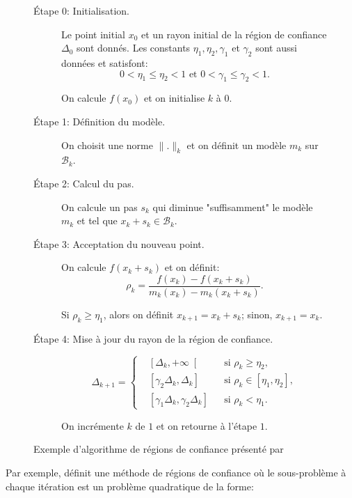 \begin{figure}
  \centering
  \begin{description}
    \item[\'Etape 0: Initialisation.] Le point initial $x_0$ et un rayon initial de la région de confiance  $\Delta_0$ sont donnés. 
    Les constants $\eta_1, \eta_2, \gamma_1$ et $\gamma_2$ sont aussi données et satisfont:
    \begin{equation*}
      0<\eta_1\leq\eta_2<1 \text{ et } 0<\gamma_1\leq\gamma_2<1.
    \end{equation*}

    On calcule $f(x_0)$ et on initialise $k$ à $0$.
    \item[\'Etape 1: Définition du modèle.] On choisit une norme $\|.\|_k$ et on définit un modèle $m_k$ sur $\mathcal{B}_k$.
    \item[\'Etape 2: Calcul du pas.] On calcule un pas $s_k$ qui diminue "suffisamment" le modèle $m_k$ et tel que $x_k+s_k\in \mathcal{B}_k$.
    \item[\'Etape 3: Acceptation du nouveau point.] On calcule $f(x_k+s_k)$ et on définit:
    \begin{equation}
      \rho_k = \dfrac{f(x_k)-f(x_k+s_k)}{m_k(x_k)-m_k(x_k+s_k)}.
    \end{equation}

    Si $\rho_k\geq \eta_1$, alors on définit $x_{k+1} = x_k+s_k$; sinon, $x_{k+1}=x_k$.
    \item[\'Etape 4: Mise à jour du rayon de la région de confiance.] 
    \begin{equation}
      \Delta_{k+1} = \left\{ \begin{aligned}
        &\left[\Delta_k, +\infty\right[&  &\text{si } \rho_k\geq \eta_2,\\
        &\left[\gamma_2\Delta_k,\Delta_k\right]&  &\text{si } \rho_k\in \left[\eta_1,\eta_2\right],\\
        &\left[\gamma_1\Delta_k,\gamma_2\Delta_k\right]&  &\text{si } \rho_k<\eta_1.
      \end{aligned}
        \right.
    \end{equation}

    On incrémente $k$ de $1$ et on retourne à l'étape $1$.
  \end{description}
  \caption{Exemple d'algorithme de régions de confiance présenté par~\citet{conngoultoin00}}
  \label{fig_algo_btr}
\end{figure}

Par exemple, \citet{yuan11} définit une méthode de régions de confiance où le sous-problème à chaque itération est un problème quadratique de la forme:


